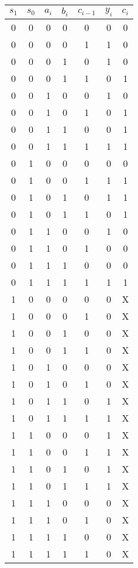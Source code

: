 \documentclass{CInf_practice}
\begin{document}
\cinftitle

\subex{}
\begin{center}
   \begin{tabular}{cc|ccc||cc}
      $s_1$ & $s_0$ & $a_i$ & $b_i$ & $c_{i-1}$ & $y_i$ & $c_i$ \\\hline
      0 & 0 & 0 & 0 & 0 & 0 & 0 \\
      0 & 0 & 0 & 0 & 1 & 1 & 0 \\
      0 & 0 & 0 & 1 & 0 & 1 & 0 \\
      0 & 0 & 0 & 1 & 1 & 0 & 1 \\
      0 & 0 & 1 & 0 & 0 & 1 & 0 \\
      0 & 0 & 1 & 0 & 1 & 0 & 1 \\
      0 & 0 & 1 & 1 & 0 & 0 & 1 \\
      0 & 0 & 1 & 1 & 1 & 1 & 1 \\
      0 & 1 & 0 & 0 & 0 & 0 & 0 \\
      0 & 1 & 0 & 0 & 1 & 1 & 1 \\
      0 & 1 & 0 & 1 & 0 & 1 & 1 \\
      0 & 1 & 0 & 1 & 1 & 0 & 1 \\
      0 & 1 & 1 & 0 & 0 & 1 & 0 \\
      0 & 1 & 1 & 0 & 1 & 0 & 0 \\
      0 & 1 & 1 & 1 & 0 & 0 & 0 \\
      0 & 1 & 1 & 1 & 1 & 1 & 1 \\
      1 & 0 & 0 & 0 & 0 & 0 & X \\
      1 & 0 & 0 & 0 & 1 & 0 & X \\
      1 & 0 & 0 & 1 & 0 & 0 & X \\
      1 & 0 & 0 & 1 & 1 & 0 & X \\
      1 & 0 & 1 & 0 & 0 & 0 & X \\
      1 & 0 & 1 & 0 & 1 & 0 & X \\
      1 & 0 & 1 & 1 & 0 & 1 & X \\
      1 & 0 & 1 & 1 & 1 & 1 & X \\
      1 & 1 & 0 & 0 & 0 & 1 & X \\
      1 & 1 & 0 & 0 & 1 & 1 & X \\
      1 & 1 & 0 & 1 & 0 & 1 & X \\
      1 & 1 & 0 & 1 & 1 & 1 & X \\
      1 & 1 & 1 & 0 & 0 & 0 & X \\
      1 & 1 & 1 & 0 & 1 & 0 & X \\
      1 & 1 & 1 & 1 & 0 & 0 & X \\
      1 & 1 & 1 & 1 & 1 & 0 & X 
   \end{tabular}
\end{center}
\end{document}
